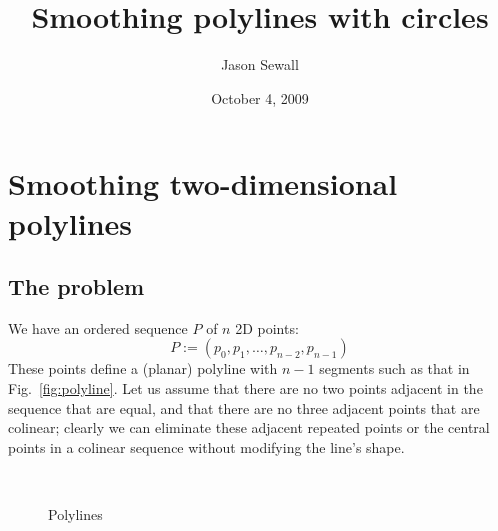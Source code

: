 \documentclass{article}
\title{Smoothing polylines with circles}
\author{Jason Sewall}
\date{October 4, 2009}
\begin{document}
\maketitle
%
\section{Smoothing two-dimensional polylines}
%
\subsection{The problem}
%
We have an ordered sequence $P$ of $n$ 2D points:
%
\begin{equation}
  \label{eq:points}
  P := \left(p_{0}, p_{1},\ldots,p_{n-2},p_{n-1}\right)
\end{equation}
%
These points define a (planar) polyline with $n-1$ segments such as that in Fig.~\ref{fig:polyline}.  Let us assume that there are no two points adjacent in the sequence that are equal, and that there are no three adjacent points that are colinear; clearly we can eliminate these adjacent repeated points or the central points in a colinear sequence without modifying the line's shape.
%
\begin{figure}[h]
  \centering
  \hfill
  \\
  \caption{Polylines}
\end{figure}
\end{document}
